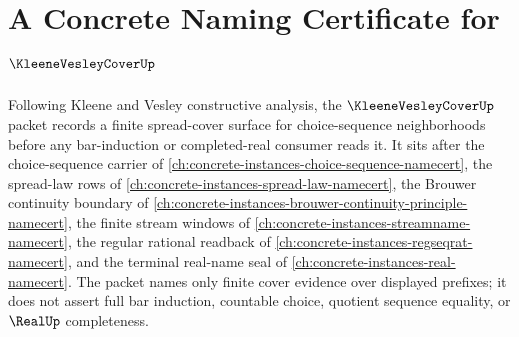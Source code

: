 \chapter{A Concrete Naming Certificate for $\KleeneVesleyCoverUp$}
\label{ch:concrete-instances-kleene-vesley-cover-namecert}

Following Kleene and Vesley constructive analysis, the $\KleeneVesleyCoverUp$ packet records a finite spread-cover surface for choice-sequence neighborhoods before any bar-induction or completed-real consumer reads it. It sits after the choice-sequence carrier of \autoref{ch:concrete-instances-choice-sequence-namecert}, the spread-law rows of \autoref{ch:concrete-instances-spread-law-namecert}, the Brouwer continuity boundary of \autoref{ch:concrete-instances-brouwer-continuity-principle-namecert}, the finite stream windows of \autoref{ch:concrete-instances-streamname-namecert}, the regular rational readback of \autoref{ch:concrete-instances-regseqrat-namecert}, and the terminal real-name seal of \autoref{ch:concrete-instances-real-namecert}. The packet names only finite cover evidence over displayed prefixes; it does not assert full bar induction, countable choice, quotient sequence equality, or $\RealUp$ completeness.

